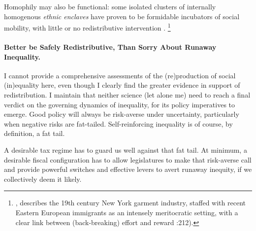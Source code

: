 Homophily may also be functional:
some isolated clusters of internally homogenous \emph{ethnic enclaves} have proven to be formidable incubators of social mobility, with little or no redistributive intervention \citep{Gladwell}.
\footnote{
	\cite{Gladwell}, describes the 19th century New York garment industry, staffed with recent Eastern European immigrants as an intensely meritocratic setting, with a clear link between (back-breaking) effort and reward \citeyearpar[212]{Gladwell}:212).
}

\paragraph{Better be Safely Redistributive, Than Sorry About Runaway Inequality.}
I cannot provide a comprehensive assessments of the (re)production of social (in)equality here, even though I clearly find the greater evidence in support of redistribution.
I maintain that neither science (let alone me) need to reach a final verdict on the governing dynamics of inequality, for its policy imperatives to emerge.
Good policy will always be risk-averse under uncertainty, particularly when negative risks are fat-tailed.
Self-reinforcing inequality is of course, by definition, a fat tail.

A desirable tax regime has to guard us well against that fat tail.
At minimum, a desirable fiscal configuration has to allow legislatures to make that risk-averse call and provide powerful switches and effective levers to avert runaway inequity, if we collectively deem it likely.


